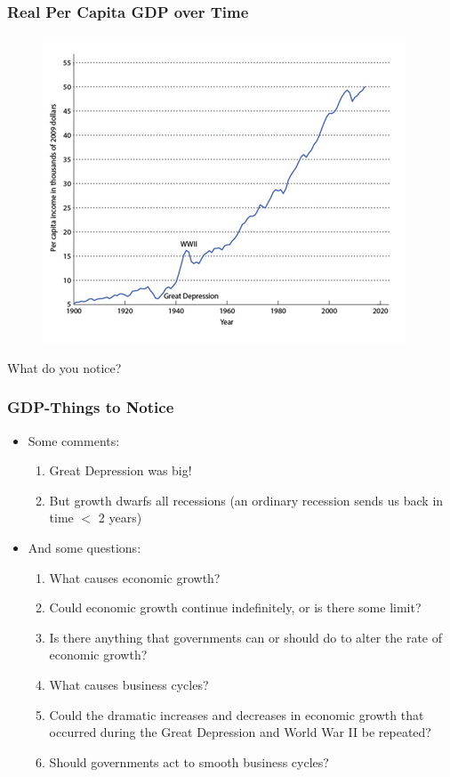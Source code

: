 \documentclass{beamer}
\begin{document}
\begin{frame}
\frametitle[alignment=center]{Real Per Capita GDP over Time}
\begin{figure}
\includegraphics[scale=0.6]{Figures/W_Fig_1pt1.png}
\end{figure}
What do you notice?
\end{frame}

\begin{frame}
\frametitle[alignment=center]{GDP-Things to Notice}
\begin{itemize}
\item Some comments:
\begin{enumerate}
\item Great Depression was big!
\bigskip
\item But growth dwarfs all recessions (an ordinary recession sends us back in time $<$ 2 years)
\bigskip
\end{enumerate}
\item And some questions:  
\begin{enumerate}
\item What causes economic growth?
\item Could economic growth continue indefinitely, or is there some limit?
\item Is there anything that governments can or should do to alter the rate of economic growth?
\item What causes business cycles?
\item Could the dramatic increases and decreases in economic growth that occurred during the Great Depression and World War II be repeated?
\item Should governments act to smooth business cycles?
\end{enumerate}
\end{itemize}
\end{frame}
\end{document}
